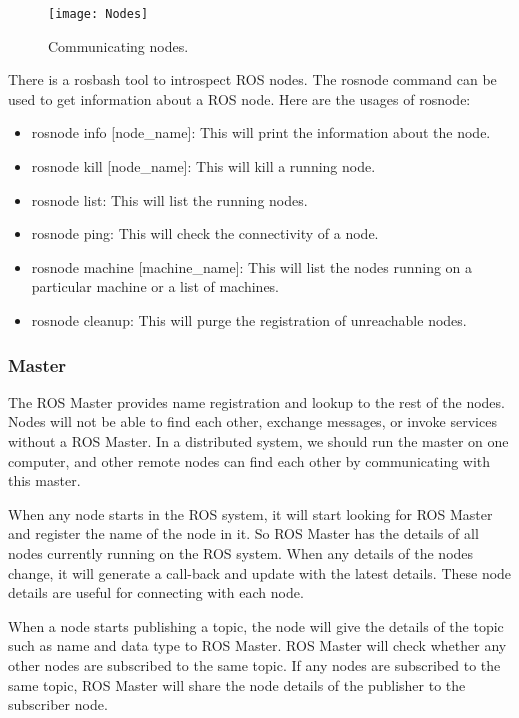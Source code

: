  	\begin{figure}[h]		
 		\centering
 		\texttt{[image: Nodes]}
 		\caption{Communicating nodes.}
 		\label{Fig:Node}
 	\end{figure}
 
	There is a rosbash tool to introspect ROS nodes.
	The rosnode command can be used to get information about a ROS node. Here are the usages of rosnode:
	\begin{itemize}
		\item rosnode info [node\_name]: This will print the information about the node.
		\item rosnode kill [node\_name]: This will kill a running node.
		\item rosnode list: This will list the running nodes.
		\item rosnode ping: This will check the connectivity of a node.
		\item rosnode machine [machine\_name]: This will list the nodes running on a particular machine or a list of machines.
		\item rosnode cleanup: This will purge the registration of unreachable nodes.
	\end{itemize}
	 
	 \subsubsection{Master}
	 The ROS Master provides name registration and lookup to the rest of the nodes. Nodes will not be able to find each other, exchange messages, or invoke services without a ROS Master. In a distributed system, we should run the master on one computer, and other remote nodes can find each other by communicating with this master.
	 
	 When any node starts in the ROS system, it will start looking for ROS Master and register the name of the node in it. So ROS Master has the details of all nodes currently running on the ROS system. When any details of the nodes change, it will generate a call-back and update with the latest details. These node details are useful for connecting with each node.
	 
	 When a node starts publishing a topic, the node will give the details of the topic such as name and data type to ROS Master. ROS Master will check whether any other nodes are subscribed to the same topic. If any nodes are subscribed to the same topic, ROS Master will share the node details of the publisher to the subscriber node.
	 
